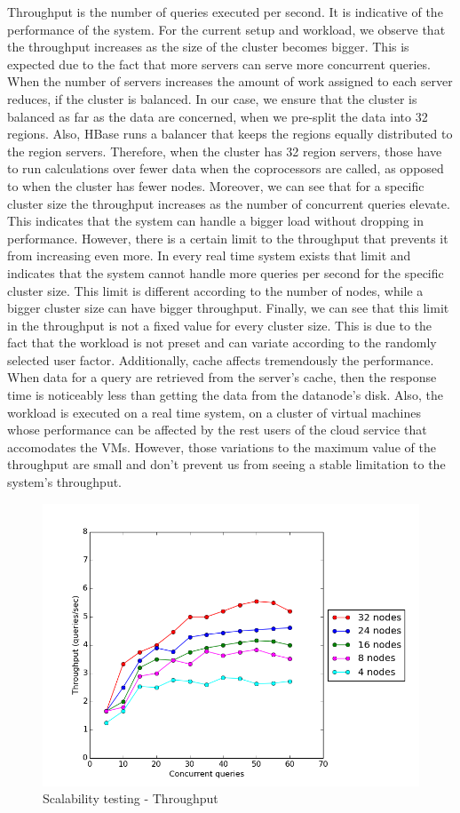 Throughput is the number of queries executed per second. It is indicative of the performance of the system. For the current setup and workload, we observe that 
the throughput increases as the size of the cluster becomes bigger. This is expected due to the fact that more servers can serve more concurrent queries. 
When the number of servers increases the amount of work assigned to each server reduces, if the cluster is balanced. In our case, we ensure that the cluster 
is balanced as far as the data are concerned, when we pre-split the data into 32 regions. Also, HBase runs a balancer that keeps the regions equally 
distributed to the region servers. Therefore, when the cluster has 32 region servers, those have to run calculations over fewer data when the coprocessors are 
called, as opposed to when the cluster has fewer nodes. Moreover, we can see that for a specific cluster size the throughput increases as the number of 
concurrent queries elevate. This indicates that the system can handle a bigger load without dropping in performance. However, there is a certain limit to the 
throughput that prevents it from increasing even more. In every real time system exists that limit and indicates that the system cannot handle more queries per 
second for the specific cluster size. This limit is different according to the number of nodes, while a bigger cluster size can have bigger throughput. 
Finally, we can see that this limit in the throughput is not a fixed value for every cluster size. This is due to the fact that the workload is not preset and 
can variate according to the randomly selected user factor. Additionally, cache affects tremendously the performance. When data for a query are retrieved from 
the server's cache, then the response time is noticeably less than getting the data from the datanode's disk. Also, the workload is executed on a real time system, 
on a cluster of virtual machines whose performance can be affected by the rest users of the cloud service that accomodates the VMs. However, those variations to the 
maximum value of the throughput are small and don't prevent us from seeing a stable limitation to the system's throughput.

\begin{figure}[H]
  \centering
  \includegraphics[height=0.6\textwidth]{figures/scalability_throughput.png}
  \caption{Scalability testing - Throughput}
\end{figure}


